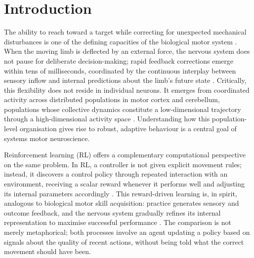 \documentclass{article}
\begin{document}
\section{Introduction}

The ability to reach toward a target while correcting for unexpected
mechanical disturbances is one of the defining capacities of the biological
motor system \citep{Pruszynski2012,Nashed2014,Dimitriou2013,Scott2004}.
When the moving limb is deflected by an external force, the nervous system
does not pause for deliberate decision-making; rapid feedback corrections
emerge within tens of milliseconds, coordinated by the
continuous interplay between sensory inflow and internal predictions about
the limb's future state
\citep{Todorov2002,Todorov2009,Codol2023,FlashHogan1985}.
Critically, this flexibility does not reside in individual neurons.
It emerges from coordinated activity across distributed populations in
motor cortex and cerebellum, populations whose collective dynamics
constitute a low-dimensional trajectory through a high-dimensional
activity space
\citep{Churchland2012,Shenoy2013,Gallego2017,Crevecoeur2019,Blohm2009,Georgopoulos1986,Kalaska1989}.
Understanding how this population-level organisation gives rise to robust,
adaptive behaviour is a central goal of systems motor neuroscience.

Reinforcement learning (RL) offers a complementary computational
perspective on the same problem.
In RL, a controller is not given explicit movement rules; instead, it
discovers a control policy through repeated interaction with an environment,
receiving a scalar reward whenever it performs well and adjusting its
internal parameters accordingly
\citep{Kaelbling1996RLSurvey,SuttonBarto2018,Schulman2017}.
This reward-driven learning is, in spirit, analogous to biological motor
skill acquisition: practice generates sensory and outcome feedback, and the
nervous system gradually refines its internal representation to maximise
successful performance \citep{Oby2019,Mathis2024,Shadmehr1994,WolpertGhahramani2000,Krakauer2019}.
The comparison is not merely metaphorical; both processes involve an agent
updating a policy based on signals about the quality of recent actions,
without being told what the correct movement should have been.
\end{document}
